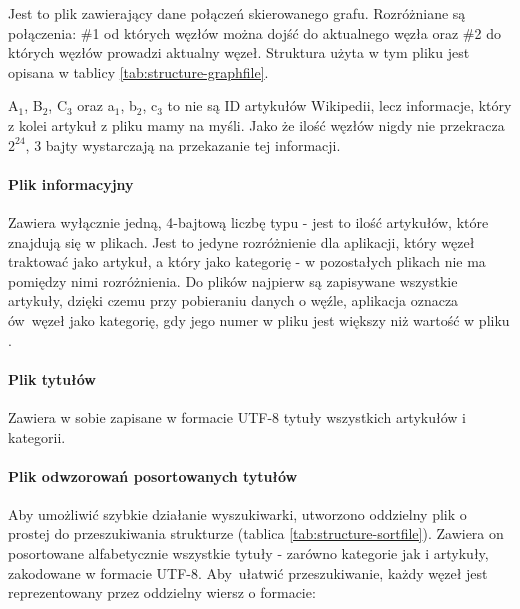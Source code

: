 Jest to plik zawierający dane połączeń skierowanego grafu. Rozróżniane są połączenia: \#1 od których węzłów można dojść do aktualnego węzła oraz \#2 do których węzłów prowadzi aktualny węzeł. Struktura użyta w tym pliku jest opisana w tablicy \ref{tab:structure-graphfile}.


A$_{1}$, B$_{2}$, C$_{3}$ oraz a$_{1}$, b$_{2}$, c$_{3}$ to nie są ID artykułów Wikipedii, lecz informacje, który z kolei artykuł z pliku  mamy na myśli. Jako że ilość węzłów nigdy nie przekracza $2^{24}$, 3 bajty wystarczają na przekazanie tej informacji.

\paragraph{Plik informacyjny }

Zawiera wyłącznie jedną, 4-bajtową liczbę typu  - jest to ilość artykułów, które znajdują się w plikach. Jest to jedyne rozróżnienie dla aplikacji, który węzeł traktować jako artykuł, a który jako kategorię - w pozostałych plikach nie ma pomiędzy nimi rozróżnienia. Do plików najpierw są zapisywane wszystkie artykuły, dzięki czemu przy pobieraniu danych o węźle, aplikacja oznacza ów~węzeł jako kategorię, gdy jego numer w pliku  jest większy niż wartość w pliku . 

\paragraph{Plik tytułów }

Zawiera w sobie zapisane w formacie UTF-8 tytuły wszystkich artykułów i kategorii.

\paragraph{Plik odwzorowań posortowanych tytułów }

Aby umożliwić szybkie działanie wyszukiwarki, utworzono oddzielny plik o prostej do przeszukiwania strukturze (tablica \ref{tab:structure-sortfile}). Zawiera on posortowane alfabetycznie wszystkie tytuły - zarówno kategorie jak i artykuły, zakodowane w formacie UTF-8. Aby~ułatwić przeszukiwanie, każdy węzeł jest reprezentowany przez oddzielny wiersz o formacie:

